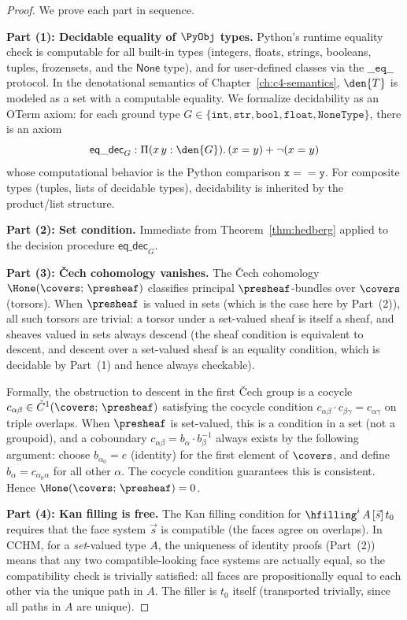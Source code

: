 \begin{proof}
We prove each part in sequence.

\textbf{Part (1): Decidable equality of $\PyObj$ types.}
Python's runtime equality check is computable for all built-in types
(integers, floats, strings, booleans, tuples, frozensets, and the
$\mathsf{None}$ type), and for user-defined classes via the
$\mathtt{\_\_eq\_\_}$ protocol.  In the denotational semantics of
Chapter~\ref{ch:c4-semantics}, $\den{T}$ is modeled as a set with a
computable equality.  We formalize decidability as an OTerm axiom:
for each ground type $G \in \{\mathtt{int}, \mathtt{str}, \mathtt{bool},
\mathtt{float}, \mathtt{NoneType}\}$, there is an axiom
\[
  \mathsf{eq\_dec}_G : \Pi(x\, y : \den{G}).\, (x = y) + \neg(x = y)
\]
whose computational behavior is the Python comparison $\mathtt{x == y}$.
For composite types (tuples, lists of decidable types), decidability is
inherited by the product/list structure.

\textbf{Part (2): Set condition.}
Immediate from Theorem~\ref{thm:hedberg} applied to the decision
procedure $\mathsf{eq\_dec}_G$.

\textbf{Part (3): \v{C}ech cohomology vanishes.}
The \v{C}ech cohomology $\Hone(\covers;\, \presheaf)$ classifies
principal $\presheaf$-bundles over $\covers$ (torsors).  When $\presheaf$
is valued in sets (which is the case here by Part~(2)), all such torsors
are trivial: a torsor under a set-valued sheaf is itself a sheaf, and
sheaves valued in sets always descend (the sheaf condition is equivalent
to descent, and descent over a set-valued sheaf is an equality condition,
which is decidable by Part~(1) and hence always checkable).

Formally, the obstruction to descent in the first \v{C}ech group is a
cocycle $c_{\alpha\beta} \in \check{C}^1(\covers;\, \presheaf)$
satisfying the cocycle condition
$c_{\alpha\beta} \cdot c_{\beta\gamma} = c_{\alpha\gamma}$
on triple overlaps.  When $\presheaf$ is set-valued, this is a condition
in a set (not a groupoid), and a coboundary $c_{\alpha\beta} =
b_\alpha \cdot b_\beta^{-1}$ always exists by the following argument:
choose $b_{\alpha_0} = e$ (identity) for the first element of
$\covers$, and define $b_\alpha = c_{\alpha_0 \alpha}$ for all other
$\alpha$.  The cocycle condition guarantees this is consistent.
Hence $\Hone(\covers;\, \presheaf) = 0$.

\textbf{Part (4): Kan filling is free.}
The Kan filling condition for $\hfilling^i\, A\, [\vec{s}]\, t_0$ requires
that the face system $\vec{s}$ is compatible (the faces agree on
overlaps).  In CCHM, for a \emph{set}-valued type $A$, the uniqueness of
identity proofs (Part~(2)) means that any two compatible-looking face
systems are actually equal, so the compatibility check is trivially
satisfied: all faces are propositionally equal to each other via the
unique path in $A$.  The filler is $t_0$ itself (transported trivially,
since all paths in $A$ are unique).


\end{proof}
